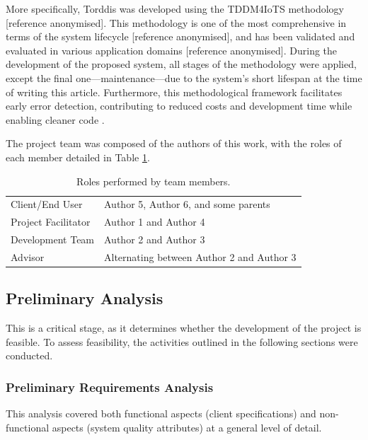 		More specifically, Torddis was developed using the TDDM4IoTS methodology [reference anonymised]. This methodology is one of the most comprehensive in terms of the system lifecycle [reference anonymised], and has been validated and evaluated in various application domains  [reference anonymised]. During the development of the proposed system, all stages of the methodology were applied, except the final one—maintenance—due to the system’s short lifespan at the time of writing this article. Furthermore, this methodological framework facilitates early error detection, contributing to reduced costs and development time while enabling cleaner code \citep{Beck2002TDD}.
		
		The project team was composed of the authors of this work, with the roles of each member detailed in Table \ref{tab:Roles}.
		
		\begin{table}[!htbp]
			\caption{Roles performed by team members.\label{tab:Roles}}
			\centering
			\begin{tabularx}{0.8\textwidth}{>{\raggedright\arraybackslash}X >{\raggedright\arraybackslash}X}
				\toprule
				\multicolumn{1}{c}{\textbf{Role}} & \multicolumn{1}{c}{\textbf{Member}} \\
				\midrule
				Client/End User & Author 5, Author 6, and some parents\\
				Project Facilitator & Author 1 and Author 4\\
				Development Team & Author 2 and Author 3\\
				Advisor & Alternating between Author 2 and Author 3\\
				\bottomrule
			\end{tabularx}
		\end{table}
		
		\subsection{Preliminary Analysis}
			This is a critical stage, as it determines whether the development of the project is feasible. To assess feasibility, the activities outlined in the following sections were conducted.
			
			\subsubsection{Preliminary Requirements Analysis}
				This analysis covered both functional aspects (client specifications) and non-functional aspects (system quality attributes) at a general level of detail.
				
